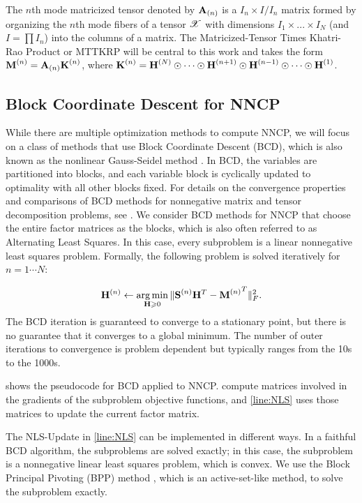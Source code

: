 The $n$th mode matricized tensor denoted by $\M{A}_{(n)}$ is a $I_n\times I/I_n$ matrix formed by organizing the $n$th mode fibers of a tensor $\T{X}$ with dimensions $I_{1} \times ... \times I_{N}$ (and $I=\prod I_n$) into the columns of a matrix. 
The Matricized-Tensor Times Khatri-Rao Product or MTTKRP will be central to this work and takes the form $\Mn{M}{n} = \Mz{A}{n} \Mn{K}{n}$, where $\Mn{K}{n}= \Mn{H}{N} \Khat \cdots \Khat \Mn{H}{n+1} \Khat \Mn{H}{n-1} \Khat  \cdots \Khat \Mn{H}{1}$. 

\subsection {Block Coordinate Descent for NNCP}

While there are multiple optimization methods to compute NNCP, we will focus on a class of methods that use Block Coordinate Descent (BCD), which is also known as the nonlinear Gauss-Seidel method \cite{Bertsekas1999}.
In BCD, the variables are partitioned into blocks, and each variable block is cyclically updated to optimality with all other blocks fixed.
For details on the convergence properties and comparisons of BCD methods for nonnegative matrix and tensor decomposition problems, see \cite{KHP2014}.
We consider BCD methods for NNCP that choose the entire factor matrices as the blocks, which is also often referred to as Alternating Least Squares.
In this case, every subproblem is a linear nonnegative least squares problem. Formally, the following problem 
is solved iteratively for $n = 1 \cdots N$:

$$\HH^{(n)} \leftarrow \argmin_{\HH \geq 0}  \| \Mn{S}{n} \HH^T - {\Mn{M}{n}}^T \|_F^2.$$
The BCD iteration is guaranteed to converge to a stationary point, but there is no guarantee that it converges to a global minimum.
The number of outer iterations to convergence is problem dependent but typically ranges from the 10s to the 1000s.


 shows the pseudocode for BCD applied to NNCP.
 compute matrices involved in the gradients of the subproblem objective functions, and \cref{line:NLS} uses those matrices to update the current factor matrix.

The NLS-Update in \cref{line:NLS} can be implemented in different ways.
In a faithful BCD algorithm, the subproblems are solved exactly; in this case, the subproblem is a nonnegative linear least squares problem, which is convex.
We use the Block Principal Pivoting (BPP) method \cite{KP2011,KHP2014}, which is an active-set-like method, to solve the subproblem exactly.

